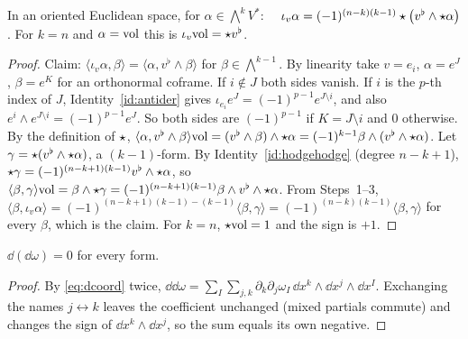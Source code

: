 \begin{identity}\label{id:iotahodge}
In an oriented Euclidean space, for $\alpha\in\bigwedge^kV^*$: $\quad\iota_v\alpha=(-1)^{(n-k)(k-1)}\star\bigl(v^\flat\wedge\star\alpha\bigr)$.
For $k=n$ and $\alpha=\mathrm{vol}$ this is $\iota_v\mathrm{vol}=\star v^\flat$.
\end{identity}
\begin{proof}
 Claim: $\langle\iota_v\alpha,\beta\rangle=\langle\alpha,v^\flat\wedge\beta\rangle$ for $\beta\in\bigwedge^{k-1}$.
By linearity take $v=e_i$, $\alpha=e^J$, $\beta=e^K$ for an orthonormal coframe. If $i\notin J$ both sides vanish. If $i$ is the
$p$-th index of $J$, Identity~\ref{id:antider} gives $\iota_{e_i}e^J=(-1)^{p-1}e^{J\setminus i}$, and also $e^i\wedge e^{J\setminus i}=(-1)^{p-1}e^J$.
So both sides are $(-1)^{p-1}$ if $K=J\setminus i$ and $0$ otherwise.
 By the definition of $\star$, $\langle\alpha,v^\flat\wedge\beta\rangle\mathrm{vol}=(v^\flat\wedge\beta)\wedge\star\alpha=(-1)^{k-1}\beta\wedge(v^\flat\wedge\star\alpha)$.
 Let $\gamma=\star(v^\flat\wedge\star\alpha)$, a $(k-1)$-form. By Identity~\ref{id:hodgehodge} (degree $n-k+1$),
$\star\gamma=(-1)^{(n-k+1)(k-1)}v^\flat\wedge\star\alpha$, so $\langle\beta,\gamma\rangle\mathrm{vol}=\beta\wedge\star\gamma=(-1)^{(n-k+1)(k-1)}\beta\wedge v^\flat\wedge\star\alpha$.
 From Steps~1--3, $\langle\beta,\iota_v\alpha\rangle=(-1)^{(n-k+1)(k-1)-(k-1)}\langle\beta,\gamma\rangle=(-1)^{(n-k)(k-1)}\langle\beta,\gamma\rangle$
for every $\beta$, which is the claim. For $k=n$, $\star\mathrm{vol}=1$ and the sign is $+1$.
\end{proof}

\begin{identity}[$\dd\dd=0$; Theorem~\ref{thm:dprops}(1)]\label{id:ddzero}
$\dd(\dd\omega)=0$ for every form.
\end{identity}
\begin{proof}
By \eqref{eq:dcoord} twice, $\dd\dd\omega=\sum_I\sum_{j,k}\partial_k\partial_j\omega_I\,\dd x^k\wedge\dd x^j\wedge\dd x^I$. Exchanging the names
$j\leftrightarrow k$ leaves the coefficient unchanged (mixed partials commute) and changes the sign of $\dd x^k\wedge\dd x^j$, so the sum
equals its own negative.
\end{proof}

